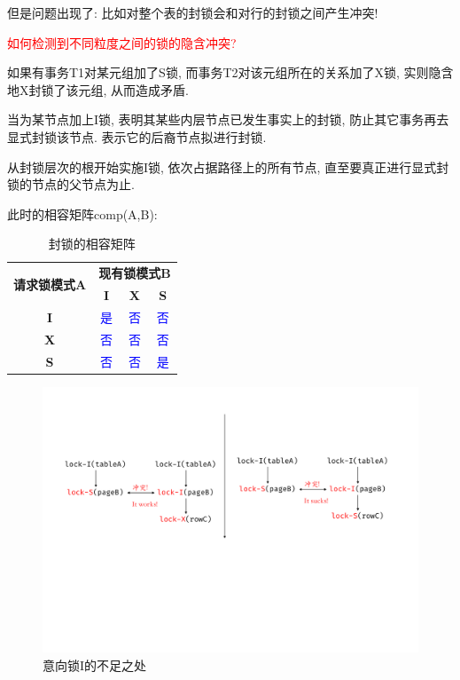 但是问题出现了: 比如对整个表的封锁会和对行的封锁之间产生冲突!

\textcolor{red}{如何检测到不同粒度之间的锁的隐含冲突?}

如果有事务T1对某元组加了S锁, 而事务T2对该元组所在的关系加了X锁, 实则隐含地X封锁了该元组, 从而造成矛盾.

\begin{definition}
  当为某节点加上I锁, 表明其某些内层节点已发生事实上的封锁, 防止其它事务再去显式封锁该节点. 表示它的后裔节点拟进行封锁.

  从封锁层次的根开始实施I锁, 依次占据路径上的所有节点, 直至要真正进行显式封锁的节点的父节点为止.
\end{definition}

此时的相容矩阵comp(A,B):
\begin{table}[H]
    \centering
    \begin{tabular}{|c|c|c|c|}
        \hline
        \multirow{2}{*}{\textbf{请求锁模式A}} & \multicolumn{3}{c|}{\textbf{现有锁模式B}} \\ \cline{2-4}
         & \textbf{I} & \textbf{X} & \textbf{S} \\ \hline
        \textbf{I} & \cellcolor{red!10}\textcolor{blue}{是} & \textcolor{blue}{否} & \textcolor{blue}{否} \\ \hline
        \textbf{X} & \textcolor{blue}{否} & \textcolor{blue}{否} & \textcolor{blue}{否} \\ \hline
        \textbf{S} & \textcolor{blue}{否} & \textcolor{blue}{否} & \textcolor{blue}{是} \\ \hline
    \end{tabular}
    \caption{封锁的相容矩阵}
\end{table}

\begin{figure}[H]
    \centering
    \includegraphics[width=.8\textwidth]{figure/I锁冲突.pdf}
    \caption{意向锁I的不足之处}
\end{figure}

